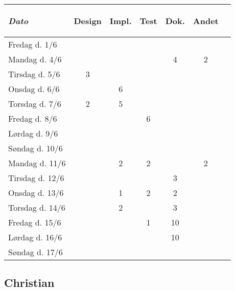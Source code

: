 \documentclass[a4paper]{article}
\begin{document}
\begin{tabular}{l | c c c c c | c}

  \emph{Dato}
  & \begin{sideways}Design\end{sideways} 
  & \begin{sideways}Impl.\end{sideways} 
  & \begin{sideways}Test\end{sideways} 
  & \begin{sideways}Dok.\end{sideways} 
  & \begin{sideways}Andet\end{sideways} \\
  \hline
  Fredag d. 1/6   &   &   &   &   & \\
  Mandag d. 4/6   &   &   &   & 4 & 2\\
  Tirsdag d. 5/6  & 3 &   &   &   & \\
  Onsdag d. 6/6   &   & 6 &   &   & \\
  Torsdag d. 7/6  & 2 & 5 &   &   & \\
  Fredag d. 8/6   &   &   & 6 &   & \\
  Lørdag d. 9/6   &   &   &   &   & \\
  Søndag d. 10/6  &   &   &   &   & \\
  Mandag d. 11/6  &   & 2 & 2 &   & 2\\
  Tirsdag d. 12/6 &   &   &   & 3 & \\
  Onsdag d. 13/6  &   & 1 & 2 & 2 & \\
  Torsdag d. 14/6 &   & 2 &   & 3 & \\
  Fredag d. 15/6  &   &   & 1 & 10 & \\
  Lørdag d. 16/6  &   &   &   & 10 & \\
  Søndag d. 17/6  &   &   &   &   & \\

\end{tabular}



\subsection{Christian} %
\end{document}
